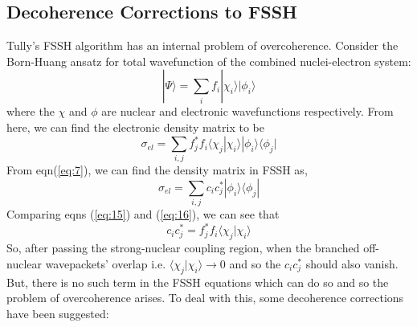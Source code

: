 \documentclass[12pt]{article}
\begin{document}
\subsection{Decoherence Corrections to FSSH}
Tully's FSSH algorithm has an internal problem of overcoherence. Consider the Born-Huang ansatz for total wavefunction of the combined nuclei-electron system:
	\begin{equation}\label{eq:14}
	|\Psi\rangle = \sum_i f_i|\chi_i\rangle|\phi_i\rangle 
	\end{equation}
where the $\chi$ and $\phi$ are nuclear and electronic wavefunctions respectively. From here, we can find the electronic density matrix to be
\begin{equation}\label{eq:15}
	\sigma_{el} = \sum_{i,j} f_j^*f_i\langle\chi_j|\chi_i\rangle|\phi_i\rangle\langle\phi_j|
	\end{equation}
From eqn(\ref{eq:7}), we can find the density matrix in FSSH as,
\begin{equation}\label{eq:16}
\sigma_{el} = \sum_{i,j} c_ic_j^*|\phi_i\rangle\langle\phi_j|
\end{equation}
Comparing eqns (\ref{eq:15}) and (\ref{eq:16}), we can see that 
\begin{equation}\label{eq:17}
 c_ic_j^* = f_j^*f_i\langle\chi_j|\chi_i\rangle 
\end{equation}
So, after passing the strong-nuclear coupling region, when the branched off-nuclear wavepackets' overlap i.e. $\langle\chi_j|\chi_i\rangle\rightarrow 0$ and so the $c_ic_j^*$ should also vanish. But, there is no such term in the FSSH equations which can do so and so the problem of overcoherence arises. To deal with this, some decoherence corrections have been suggested\cite{decoherence}:
\end{document}
